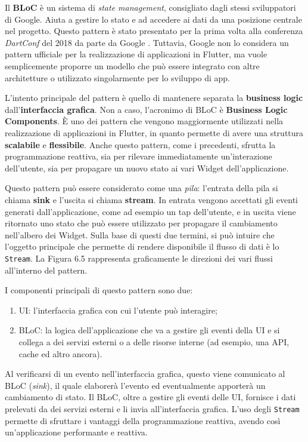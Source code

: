 Il \textbf{BLoC} è un sistema di \textit{state management}, consigliato dagli stessi sviluppatori di Google. Aiuta a gestire lo stato e ad accedere ai dati da una posizione centrale nel progetto. Questo pattern è stato presentato per la prima volta alla conferenza \textit{DartConf} del 2018 da parte da Google \cite{presentazione_bloc}. Tuttavia, Google non lo considera un pattern ufficiale per la realizzazione di applicazioni in Flutter, ma vuole semplicemente proporre un modello che può essere integrato con altre architetture o utilizzato singolarmente per lo sviluppo di app.

L'intento principale del pattern è quello di mantenere separata la \textbf{business logic} dall'\textbf{interfaccia grafica}. Non a caso, l'acronimo di BLoC è \textbf{Business Logic Components}. È uno dei pattern che vengono maggiormente utilizzati nella realizzazione di applicazioni in Flutter, in quanto permette di avere una struttura \textbf{scalabile} e \textbf{flessibile}. Anche questo pattern, come i precedenti, sfrutta la programmazione reattiva, sia per rilevare immediatamente un'interazione dell'utente, sia per propagare un nuovo stato ai vari Widget dell'applicazione.

Questo pattern può essere considerato come una \textit{pila}: l'entrata della pila si chiama \textbf{sink} e l’uscita si chiama \textbf{stream}. In entrata vengono accettati gli eventi generati dall’applicazione, come ad esempio un tap dell’utente, e in uscita viene ritornato uno stato che può essere utilizzato per propagare il cambiamento nell'albero dei Widget. Sulla base di questi due termini, si può intuire che l'oggetto principale che permette di rendere disponibile il flusso di dati è lo \verb|Stream|. La Figura 6.5 rappresenta graficamente le direzioni dei vari flussi all'interno del pattern.

I componenti principali di questo pattern sono due:
\begin{enumerate}
	\item UI: l'interfaccia grafica con cui l'utente può interagire;
	\item BLoC: la logica dell'applicazione che va a gestire gli eventi della UI e si collega a dei servizi esterni o a delle risorse interne (ad esempio, una API, cache ed altro ancora).
\end{enumerate}

Al verificarsi di un evento nell'interfaccia grafica, questo viene comunicato al BLoC (\textit{sink}), il quale elaborerà l'evento ed eventualmente apporterà un cambiamento di stato. Il BLoC, oltre a gestire gli eventi delle UI, fornisce i dati prelevati da dei servizi esterni e li invia all'interfaccia grafica. L'uso degli \verb|Stream| permette di sfruttare i vantaggi della programmazione reattiva, avendo così un'applicazione performante e reattiva. 

